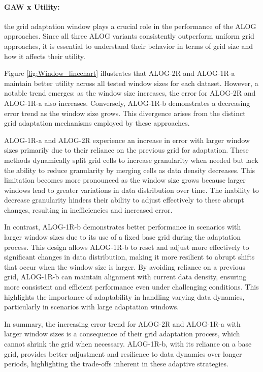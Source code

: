 \paragraph{GAW x Utility:}the grid adaptation window plays a crucial role in the performance of the ALOG approaches. Since all three ALOG variants consistently outperform uniform grid approaches, it is essential to understand their behavior in terms of grid size and how it affects their utility.

Figure \ref{fig:Window_linechart} illustrates that ALOG-2R and ALOG-1R-a maintain better utility across all tested window sizes for each dataset. However, a notable trend emerges: as the window size increases, the error for ALOG-2R and ALOG-1R-a also increases. Conversely, ALOG-1R-b demonstrates a decreasing error trend as the window size grows. This divergence arises from the distinct grid adaptation mechanisms employed by these approaches.

ALOG-1R-a and ALOG-2R experience an increase in error with larger window sizes primarily due to their reliance on the previous grid for adaptation. These methods dynamically split grid cells to increase granularity when needed but lack the ability to reduce granularity by merging cells as data density decreases. This limitation becomes more pronounced as the window size grows because larger windows lead to greater variations in data distribution over time. The inability to decrease granularity hinders their ability to adjust effectively to these abrupt changes, resulting in inefficiencies and increased error.

In contrast, ALOG-1R-b demonstrates better performance in scenarios with larger window sizes due to its use of a fixed base grid during the adaptation process. This design allows ALOG-1R-b to reset and adjust more effectively to significant changes in data distribution, making it more resilient to abrupt shifts that occur when the window size is larger. By avoiding reliance on a previous grid, ALOG-1R-b can maintain alignment with current data density, ensuring more consistent and efficient performance even under challenging conditions. This highlights the importance of adaptability in handling varying data dynamics, particularly in scenarios with large adaptation windows.

In summary, the increasing error trend for ALOG-2R and ALOG-1R-a with larger window sizes is a consequence of their grid adaptation process, which cannot shrink the grid when necessary. ALOG-1R-b, with its reliance on a base grid, provides better adjustment and resilience to data dynamics over longer periods, highlighting the trade-offs inherent in these adaptive strategies.


